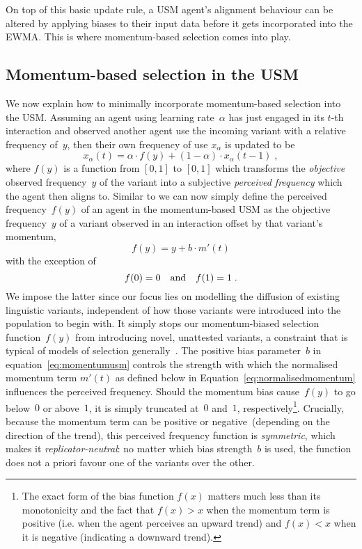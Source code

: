 On top of this basic update rule, a USM agent's alignment behaviour can be altered by applying biases to their input data before it gets incorporated into the EWMA. This is where momentum-based selection comes into play.

\subsection{Momentum-based selection in the USM}

We now explain how to minimally incorporate momentum-based selection into the USM. Assuming an agent using learning rate~$\alpha$ has just engaged in its $t$-th interaction and observed another agent use the incoming variant with a relative frequency of~$y$, then their own frequency of use $x_\alpha$ is updated to be
\begin{equation}
x_\alpha(t) = \alpha\cdot f(y) + (1-\alpha)\cdot x_\alpha(t\!-\!1)\;,
\label{eq:usm}
\end{equation}
where $f(y)$ is a function from $[0,1]$ to $[0,1]$ which transforms the \emph{objective} observed frequency~$y$ of the variant into a subjective \emph{perceived frequency} which the agent then aligns to. 
Similar to \cite{Gureckis2009} we can now simply define the perceived frequency~$f(y)$ of an agent in the momentum-based USM as the objective frequency~$y$ of a variant observed in an interaction offset by that variant's momentum,
\begin{equation}
f(y) = y + b \cdot m'(t)
\label{eq:momentumusm}
\end{equation}
with the exception of
\begin{equation}
f(0)=0 \quad {\rm and} \quad f(1)=1\;.
\label{eq:momentumusmconstraint}
\end{equation}
We impose the latter since our focus lies on modelling the diffusion of existing linguistic variants, independent of how those variants were introduced into the population to begin with. It simply stops our momentum-biased selection function~$f(y)$ from introducing novel, unattested variants, a constraint that is typical of models of selection generally~\citep[see e.g.][]{Boyd1985}. The positive bias parameter~$b$ in equation~\ref{eq:momentumusm} controls the strength with which the normalised momentum term $m'(t)$ as defined below in Equation~\ref{eq:normalisedmomentum} influences the perceived frequency. Should the momentum bias cause~$f(y)$ to go below~$0$ or above~$1$, it is simply truncated at~$0$ and~$1$, respectively\footnote{The exact form of the bias function $f(x)$ matters much less than its monotonicity and the fact that $f(x)>x$ when the momentum term is positive (i.e. when the agent perceives an upward trend) and $f(x)<x$ when it is negative (indicating a downward trend).}. Crucially, because the momentum term can be positive or negative~(depending on the direction of the trend), this perceived frequency function is \emph{symmetric}, which makes it \emph{replicator-neutral}: no matter which bias strength~$b$ is used, the function does not a priori favour one of the variants over the other.

